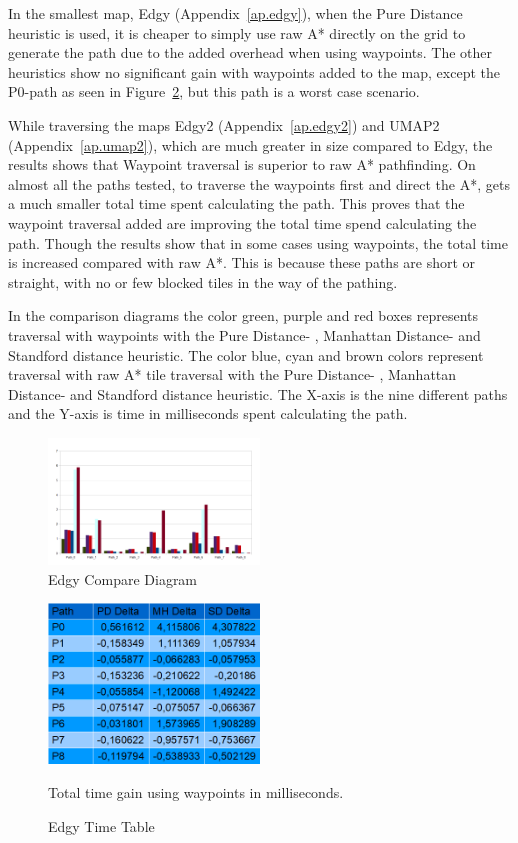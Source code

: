 \documentclass[a4paper]{article}
\begin{document}
In the smallest map, Edgy (Appendix~\ref{ap.edgy}), when the Pure Distance heuristic is used, it is cheaper to simply use raw A* directly on the grid to generate the path due to the added overhead when using waypoints. The other heuristics show no significant gain with waypoints added to the map, except the P0-path as seen in Figure~\ref{fig:Edgy_cd}, but this path is a worst case scenario.
	
While traversing the maps Edgy2 (Appendix~\ref{ap.edgy2}) and UMAP2 (Appendix~\ref{ap.umap2}), which are much greater in size compared to Edgy, the results shows that Waypoint traversal is superior to raw A* pathfinding. On almost all the paths tested, to traverse the waypoints first and direct the A*, gets a much smaller total time spent calculating the path. This proves that the waypoint traversal added are improving the total time spend calculating the path. Though the results show that in some cases using waypoints, the total time is increased compared with raw A*. This is because these paths are short or straight, with no or few blocked tiles in the way of the pathing.
	
In the comparison diagrams the color green, purple and red boxes represents traversal with waypoints with the Pure Distance- , Manhattan Distance- and Standford distance heuristic.
The color blue, cyan and brown colors represent traversal with raw A* tile traversal with the Pure Distance- , Manhattan Distance- and Standford distance heuristic.
The  X-axis is the nine different paths and the Y-axis is time in milliseconds spent calculating the path.

\begin{figure}[h!]
\centering
\includegraphics[width=0.5\textwidth,height=\textheight,keepaspectratio]{ChartsAndFigures/Edgy_d2.png}
\caption{Edgy Compare Diagram}
\label{fig:Edgy_d2}
\end{figure}

\begin{figure}[h!]
\centering
\includegraphics[width=0.5\textwidth,height=\textheight,keepaspectratio]{ChartsAndFigures/Edgy_timeTable.png}
\caption{Edgy Time Table}
Total time gain using waypoints in milliseconds.
\label{fig:Edgy_cd}
\end{figure}
\end{document}
